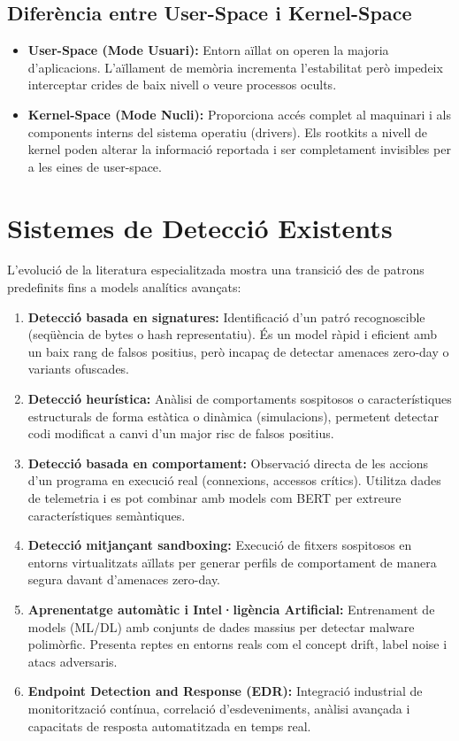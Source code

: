 \documentclass[12pt,a4paper]{report}
\begin{document}
\subsection{Diferència entre User-Space i Kernel-Space}
\begin{itemize}
    \item \textbf{User-Space (Mode Usuari):} Entorn aïllat on operen la majoria d'aplicacions. L'aïllament de memòria incrementa l'estabilitat però impedeix interceptar crides de baix nivell o veure processos ocults.
    \item \textbf{Kernel-Space (Mode Nucli):} Proporciona accés complet al maquinari i als components interns del sistema operatiu (drivers). Els rootkits a nivell de kernel poden alterar la informació reportada i ser completament invisibles per a les eines de user-space.
\end{itemize}

\section{Sistemes de Detecció Existents}
L'evolució de la literatura especialitzada mostra una transició des de patrons predefinits fins a models analítics avançats:
\begin{enumerate}
    \item \textbf{Detecció basada en signatures:} Identificació d'un patró recognoscible (seqüència de bytes o hash representatiu). És un model ràpid i eficient amb un baix rang de falsos positius, però incapaç de detectar amenaces zero-day o variants ofuscades.
    \item \textbf{Detecció heurística:} Anàlisi de comportaments sospitosos o característiques estructurals de forma estàtica o dinàmica (simulacions), permetent detectar codi modificat a canvi d'un major risc de falsos positius.
    \item \textbf{Detecció basada en comportament:} Observació directa de les accions d'un programa en execució real (connexions, accessos crítics). Utilitza dades de telemetria i es pot combinar amb models com BERT per extreure característiques semàntiques.
    \item \textbf{Detecció mitjançant sandboxing:} Execució de fitxers sospitosos en entorns virtualitzats aïllats per generar perfils de comportament de manera segura davant d'amenaces zero-day.
    \item \textbf{Aprenentatge automàtic i Intel·ligència Artificial:} Entrenament de models (ML/DL) amb conjunts de dades massius per detectar malware polimòrfic. Presenta reptes en entorns reals com el concept drift, label noise i atacs adversaris.
    \item \textbf{Endpoint Detection and Response (EDR):} Integració industrial de monitorització contínua, correlació d'esdeveniments, anàlisi avançada i capacitats de resposta automatitzada en temps real.
\end{enumerate}
\end{document}
